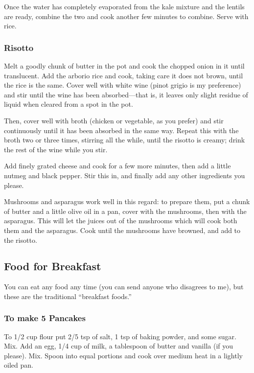 \documentclass[10pt]{article}
\begin{document}
Once the water has completely evaporated from the kale mixture and the lentils are ready, combine the two and cook another few minutes to combine.
Serve with rice.

\subsubsection*{Risotto}

Melt a goodly chunk of butter in the pot and cook the chopped onion in it until translucent.
Add the arborio rice and cook, taking care it does not brown, until the rice is the same.
Cover well with white wine (pinot grigio is my preference) and stir until the wine has been absorbed---that is, it leaves only slight residue of liquid when cleared from a spot in the pot.

Then, cover well with broth (chicken or vegetable, as you prefer) and stir continuously until it has been absorbed in the same way.
Repeat this with the broth two or three times, stirring all the while, until the risotto is creamy; drink the rest of the wine while you stir.

Add finely grated cheese and cook for a few more minutes, then add a little nutmeg and black pepper.
Stir this in, and finally add any other ingredients you please.

Mushrooms and asparagus work well in this regard: to prepare them, put a chunk of butter and a little olive oil in a pan, cover with the mushrooms, then with the asparagus.
This will let the juices out of the mushrooms which will cook both them and the asparagus.
Cook until the mushrooms have browned, and add to the risotto.

\subsection*{Food for Breakfast}

You can eat any food any time (you can send anyone who disagrees to me), but these are the traditional ``breakfast foods.''

\subsubsection*{To make 5 Pancakes}

To 1/2 cup flour put 2/5 tsp of salt, 1 tsp of baking powder, and some sugar.
Mix.
Add an egg, 1/4 cup of milk, a tablespoon of butter and vanilla (if you please).
Mix.
Spoon into equal portions and cook over medium heat in a lightly oiled pan.
\end{document}
